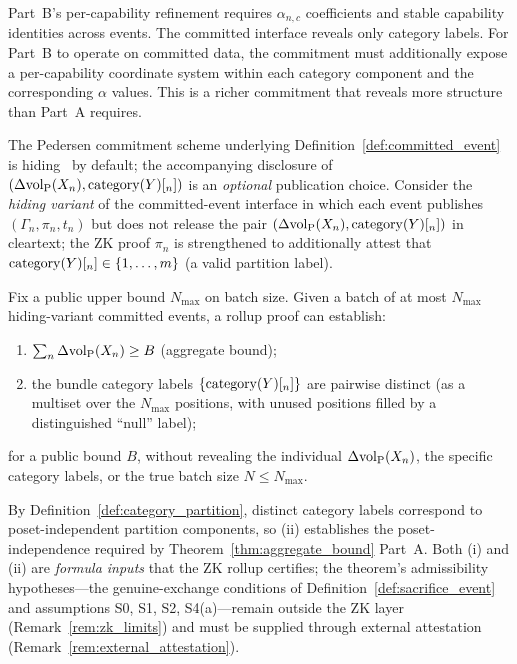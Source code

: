 \begin{remark}
\label{rem:commit_part_b}
Part~B's per-capability refinement requires $\alpha_{n,c}$
coefficients and stable capability identities across events.
The committed interface reveals only category labels.
For Part~B to operate on committed data, the commitment must
additionally expose a per-capability coordinate system within
each category component and the corresponding $\alpha$ values.
This is a richer commitment that reveals more structure than
Part~A requires.
\end{remark}

\begin{proposition}
\label{prop:zk_aggregation}
The Pedersen commitment scheme underlying
Definition~\ref{def:committed_event} is
hiding~\citep[Definition~6]{lasser2026exo} by default; the
accompanying disclosure of $(\Delta{\operatorname{vol}_{\mathrm{P}}}(X_n), \mathrm{category}(Y)[_n])$ is an
\emph{optional} publication choice.  Consider the \emph{hiding
variant} of the committed-event interface in which each event
publishes $(\Gamma_n, \pi_n, t_n)$ but does not release the pair
$(\Delta{\operatorname{vol}_{\mathrm{P}}}(X_n), \mathrm{category}(Y)[_n])$ in cleartext; the ZK proof
$\pi_n$ is strengthened to additionally attest that
$\mathrm{category}(Y)[_n] \in \{1, \ldots, m\}$ (a valid partition label).

Fix a public upper bound $N_{\max}$ on batch size.  Given a batch
of at most $N_{\max}$ hiding-variant committed events, a rollup
proof can establish:
\begin{enumerate}
\item[(i)] $\sum_{n} \Delta{\operatorname{vol}_{\mathrm{P}}}(X_n) \geq B$
  (aggregate bound);
\item[(ii)] the bundle category labels $\{\mathrm{category}(Y)[_n]\}$ are
  pairwise distinct (as a multiset over the $N_{\max}$
  positions, with unused positions filled by a distinguished
  ``null'' label);
\end{enumerate}
for a public bound $B$, without revealing the individual
$\Delta{\operatorname{vol}_{\mathrm{P}}}(X_n)$, the specific category labels, or the true
batch size $N \leq N_{\max}$.

By Definition~\ref{def:category_partition}, distinct category
labels correspond to poset-independent partition components, so
(ii) establishes the poset-independence required by
Theorem~\ref{thm:aggregate_bound} Part~A.  Both (i) and (ii) are
\emph{formula inputs} that the ZK rollup certifies; the
theorem's admissibility hypotheses---the genuine-exchange
conditions of Definition~\ref{def:sacrifice_event} and
assumptions S0, S1, S2, S4(a)---remain outside the ZK layer
(Remark~\ref{rem:zk_limits}) and must be supplied through
external attestation (Remark~\ref{rem:external_attestation}).
\end{proposition}

